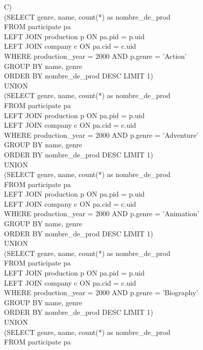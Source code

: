 \documentclass{article}
\begin{document}
C)\\
(SELECT genre, name, count(*) as nombre_de_prod\\
FROM participate pa\\
LEFT JOIN production p ON pa.pid = p.uid\\
LEFT JOIN company c ON pa.cid = c.uid\\
WHERE production_year = 2000 AND p.genre = 'Action'\\  
GROUP BY name, genre\\
ORDER BY nombre_de_prod DESC LIMIT 1)\\
UNION \\
(SELECT genre, name, count(*) as nombre_de_prod\\
FROM participate pa\\
LEFT JOIN production p ON pa.pid = p.uid\\
LEFT JOIN company c ON pa.cid = c.uid\\
WHERE production_year = 2000 AND p.genre = 'Adventure' \\ 
GROUP BY name, genre\\
ORDER BY nombre_de_prod DESC LIMIT 1)\\
UNION\\
(SELECT genre, name, count(*) as nombre_de_prod\\
FROM participate pa\\
LEFT JOIN production p ON pa.pid = p.uid\\
LEFT JOIN company c ON pa.cid = c.uid\\
WHERE production_year = 2000 AND p.genre = 'Animation'  \\
GROUP BY name, genre\\
ORDER BY nombre_de_prod DESC LIMIT 1)\\
UNION\\
(SELECT genre, name, count(*) as nombre_de_prod\\
FROM participate pa\\
LEFT JOIN production p ON pa.pid = p.uid\\
LEFT JOIN company c ON pa.cid = c.uid\\
WHERE production_year = 2000 AND p.genre = 'Biography'  \\
GROUP BY name, genre\\
ORDER BY nombre_de_prod DESC LIMIT 1)\\
UNION \\
(SELECT genre, name, count(*) as nombre_de_prod\\
FROM participate pa\\
\end{document}
